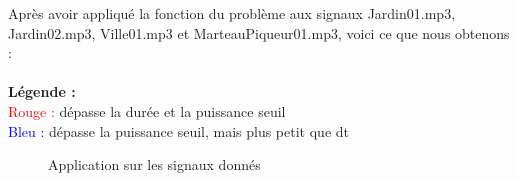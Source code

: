 Après avoir appliqué la fonction du problème aux signaux Jardin01.mp3, Jardin02.mp3, Ville01.mp3 et MarteauPiqueur01.mp3, voici ce que nous obtenons :
\\
\\
\textbf{Légende :}
\\
\textcolor{red}{Rouge :} dépasse la durée et la puissance seuil
\\
\textcolor{blue}{Bleu : }dépasse la puissance seuil, mais plus petit que dt

\begin{figure}[htb]
\caption{Application sur les signaux donnés}
\label{Fig.main.2}
\end{figure}

